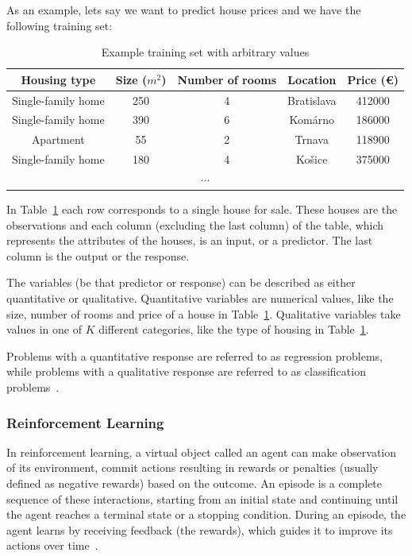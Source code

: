 \documentclass[a4paper,oneside,onecolumn,12pt]{book}
\begin{document}
		As an example, lets say we want to predict house prices and we have the following training set:
		\begin{table}[H]
		\begin{center}
		\begin{tabular}{|c|c|c|c||c|}
			\hline
			\textbf{Housing type} & \textbf{Size ($m^2$)} & \textbf{Number of rooms} & \textbf{Location} & \textbf{Price (€)}\\
			\hline
			Single-family home & 250 & 4 & Bratislava & 412000\\
			\hline
			Single-family home & 390 & 6 & Komárno & 186000\\ 
			\hline
			Apartment & 55 & 2 & Trnava & 118900\\
			\hline
			Single-family home & 180 & 4 & Košice & 375000\\
			\hline
			\multicolumn{5}{|c|}{$\cdots$} \\
			\hline
		\end{tabular}
		\end{center}
		\caption{Example training set with arbitrary values}
		\label{table:example_train_set}
		\end{table}
		In Table~\ref{table:example_train_set} each row corresponds to a single house for sale. These houses are the observations and each column (excluding the last column) of the table, which represents the attributes of the houses, is an input, or a predictor. The last column is the output or the response.

		The variables (be that predictor or response) can be described as either quantitative or qualitative. Quantitative variables are numerical values, like the size, number of rooms and price of a house in Table~\ref{table:example_train_set}. Qualitative variables take values in one of $K$ different categories, like the type of housing in Table~\ref{table:example_train_set}. 
		
		Problems with a quantitative response are referred to as regression problems, while problems with a qualitative response are referred to as classification problems~\cite{AISL}.

		\subsubsection{Reinforcement Learning}
		In reinforcement learning, a virtual object called an agent can make observation of its environment, commit actions resulting in rewards or penalties (usually defined as negative rewards) based on the outcome. An episode is a complete sequence of these interactions, starting from an initial state and continuing until the agent reaches a terminal state or a stopping condition. During an episode, the agent learns by receiving feedback (the rewards), which guides it to improve its actions over time~\cite{HMLSKT}.
\end{document}
